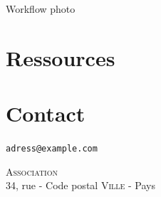 \documentclass[12pt,nofoldmark,notumble]{leaflet}
\begin{document}
\clearpage

\begin{center}
  \setlength{\fboxsep}{0pt}%
  \setlength{\fboxrule}{0pt}%

  Workflow photo
\end{center}

\vspace*{\fill}

\section{\faInfoCircle Ressources}

\begin{description}[align=right,labelwidth=4.2cm]

\item [Retouche photo] 

\item [Développement RAW] 

\item [PAO] 

\item [Logiciels] 

\item [Photo] 

\end{description}
   
\vspace*{\fill}

\section{\faEnvelope Contact}

\texttt{adress@example.com}
\vspace*{\fill}
\begin{center}
{ \textsc{Association} \\ 34,
  rue - Code postal \textsc{Ville} - Pays}

\end{center}
\end{document}
